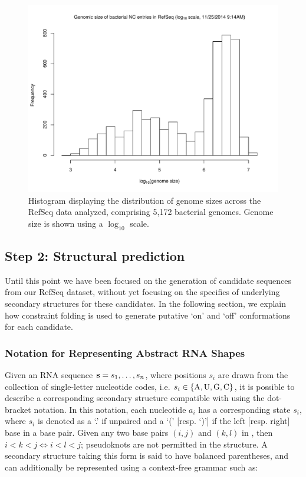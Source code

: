 \begin{figure}[!ht]
\centering
\includegraphics[width=.9\textwidth]{Figures/Ribofinder/refseqGenomeSizes.pdf}
\caption{Histogram displaying the distribution of genome sizes across the RefSeq
data analyzed, comprising 5,172 bacterial genomes. Genome size is shown using a
$\log_{10}$ scale.}
\label{fig:rfinder:genomeSizes}
\end{figure}

\subsection{Step 2: Structural prediction}
\label{subsec:rfinder:strpred}

Until this point we have been focused on the generation of candidate sequences
from our RefSeq dataset, without yet focusing on the specifics of underlying
secondary structures for these candidates. In the following section, we explain
how constraint folding is used to generate putative `on' and `off' conformations
for each candidate.

\subsubsection{Notation for Representing Abstract RNA Shapes}
\label{subsubsec:rfinder:shapes}

Given an RNA sequence ${\bf s} = s_1,\dots,s_n$, where positions $s_i$ are drawn from the
collection of single-letter nucleotide codes, i.e.
$s_i \in \{\text{A,\,U,\,G,\,C}\}$, it is possible to describe a corresponding
secondary structure \strS compatible with \seq using the dot-bracket notation.
In this notation, each nucleotide $a_i$ has a corresponding state $s_i$, where
$s_i$ is denoted as a `.' if unpaired and a `(' [resp. `)'] if the left [resp.
right] base in a base pair. Given any two base pairs $(i,j)$ and $(k,l)$ in \strS,
then $i < k < j \iff i < l < j$; pseudoknots are not permitted in the structure. A
secondary structure taking this form is said to have balanced parentheses, and can
additionally be represented using a context-free grammar such as:

